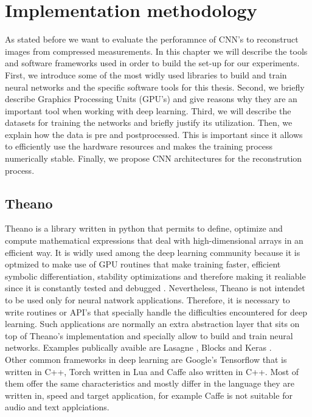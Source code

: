 \chapter{Implementation methodology}
As stated before we want to evaluate the perforamnce of CNN's to reconstruct images from compressed measurements. In this chapter we will describe the tools and software frameworks used in order to build the set-up for our experiments. First,  we introduce some of the most widly used libraries to build and train neural networks and the specific software tools for this thesis. Second, we briefly describe Graphics Processing Units (GPU's) and give reasons why they are an important tool when working with deep learning. Third, we will describe the datasets for training the networks and briefly justify its utilization. Then, we explain how the data is pre and postprocessed. This is important since it allows to efficiently use the hardware resources and makes the training process numerically stable. Finally, we propose CNN architectures for the reconstrution process.   

\section{Theano}
Theano is a library written in python that permits to define, optimize and compute mathematical expressions that deal with high-dimensional arrays in an efficient way. It is widly used among the deep learning community because it is optmized to make use of GPU routines that make training faster, efficient symbolic differentiation, stability optimizations and therefore making it realiable since it is constantly tested and debugged \cite{2016arXiv160502688short}. Nevertheless, Theano is not intendet to be used only for neural natwork applications. Therefore, it is necessary to write routines or API's that specially handle the difficulties encountered for deep learning. Such applications are normally an extra abstraction layer that sits on top of Theano's implementation and specially allow to build and train neural networks. Examples publically avaible are Lasagne \cite{sander_dieleman_2015_27878}, Blocks \cite{van2015blocks} and Keras \cite{chollet2015keras}. \\
Other common frameworks in deep learning are Google's Tensorflow \cite{tensorflow2015-whitepaper} that is written in C++, Torch \cite{torch} written in Lua and Caffe \cite{jia2014caffe} also written in C++. Most of them offer the same characteristics and mostly differ in the language they are written in, speed and target application, for example Caffe is not suitable for audio and text applciations.           
